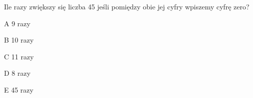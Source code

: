 \begin{tresc}
Ile razy zwiększy się liczba 45 jeśli pomiędzy obie jej cyfry wpiszemy cyfrę zero?
\end{tresc}
\begin{wariant}{A} 9 razy \end{wariant}
\begin{wariant}{B} 10 razy \end{wariant}
\begin{wariant}{C} 11 razy \end{wariant}
\begin{wariant}{D} 8 razy \end{wariant}
\begin{wariant}{E} 45 razy \end{wariant}
